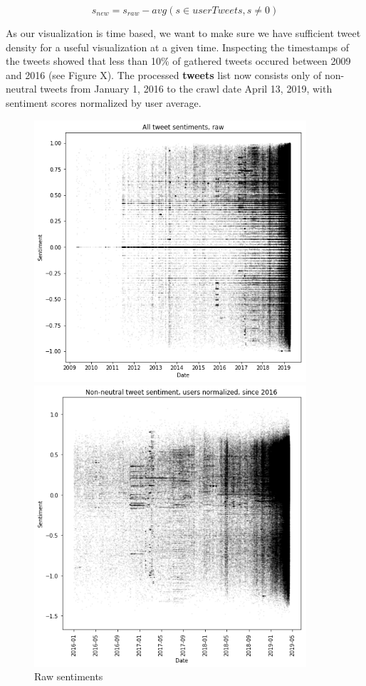 \documentclass[12pt]{article}
\begin{document}
\[
    s_{new} = s_{raw} - avg(s\in userTweets, s \neq 0)
\]

As our visualization is time based, we want to make sure we have sufficient tweet density for a useful visualization at a given time. Inspecting the timestamps of the tweets showed that less than 10\% of gathered tweets occured between 2009 and 2016 (see Figure X). The processed \textbf{tweets} list now consists only of non-neutral tweets from January 1, 2016 to the crawl date April 13, 2019, with sentiment scores normalized by user average.

\begin{figure}[h!]
    \centering
    \begin{minipage}{0.45\textwidth}
        \centering
        \includegraphics[width=0.9\textwidth]{raw_sentiments} %
        \caption{Raw sentiments}
    \end{minipage}\hfill
    \begin{minipage}{0.45\textwidth}
        \centering
        \includegraphics[width=0.9\textwidth]{nnz_since_2016} %

\end{minipage}
\end{figure}
\end{document}
